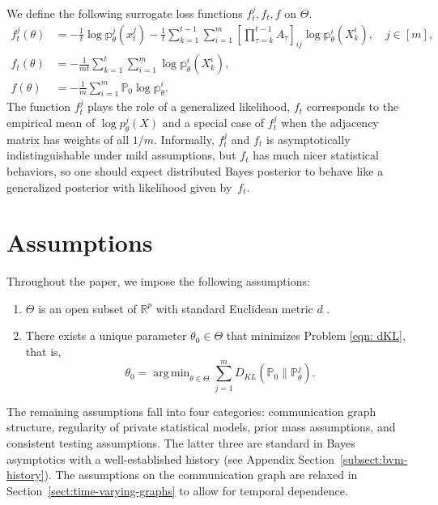 \documentclass[twoside,11pt]{article}
\numberwithin{equation}{section}
\newcommand{\R}{{\mathbb{R}}}
\newcommand\bP{\mathbb{P}}
\newcommand\bp{\mathbb{p}}
\DeclareMathOperator*{\argmin}{arg\,min}
\begin{document}
{We define the following surrogate loss functions $f_t^j, f_t, f$ on $\Theta$. 
\begin{align}
    \label{def:f_t^j}
    f_t^j(\theta) &= -\frac{1}{t} \log \bp_\theta^j(x_t^j) 
    - \frac{1}{t} \sum_{k = 1}^{t-1} \sum_{i = 1}^m \left[ \prod_{\tau = k}^{t-1} A_\tau \right]_{ij} \log \bp_\theta^i(X_k^i), \quad j \in [m], \\
    \label{def:f_t}
    f_t(\theta) &= -\frac{1}{mt} \sum_{k = 1}^t \sum_{i = 1}^m \log \bp_\theta^i(X_k^i), \\
    \label{def:f}
    f(\theta) &= - \frac{1}{m} \sum_{i = 1}^m \bP_0 \log \bp^i_\theta.
\end{align}
The function  $f_t^j$ plays the role of a generalized likelihood,  $f_t$ corresponds to the empirical mean of $\log p^j_\theta(X)$ and a special case of $f_t^j$ when the adjacency matrix has weights of all $1/m$. Informally, $f_t^j$ and $f_t$ is asymptotically indistinguishable under mild assumptions, but $f_t$ has much nicer statistical behaviors, so one should expect distributed Bayes posterior to behave like a generalized posterior with likelihood given by~$f_t$. 

\section{Assumptions} \label{sect:assumptions}
Throughout the paper, we impose the following assumptions:
\begin{enumerate}[label=(\roman*)]
    \item $\Theta$ is an open subset of $\R^p$ with standard Euclidean metric $d$ . 
    \item There exists a unique parameter $\theta_0 \in \Theta$ that minimizes Problem \eqref{eqn: dKL}, that is,
\begin{equation}\label{def:theta_0}
\theta_0 = \argmin_{\theta \in \Theta}\sum_{j = 1}^m D_{KL}(\bP_0\parallel \bP_\theta^j). 
\end{equation}
\end{enumerate}
The remaining assumptions fall into four categories: communication graph structure, regularity of private statistical models, prior mass assumptions, and consistent testing assumptions. The latter three are standard in Bayes asymptotics with a well-established history (see Appendix Section~\ref{subsect:bvm-history}). The assumptions on the communication graph are relaxed in Section~\ref{sect:time-varying-graphs} to allow for temporal dependence. 

}
\end{document}
